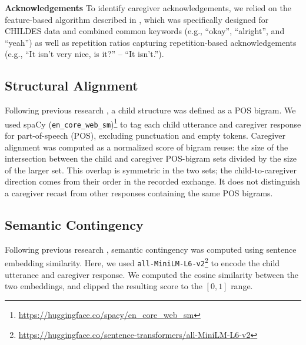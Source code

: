 \noindent \textbf{Acknowledgements} To identify caregiver acknowledgements, we relied on the feature-based algorithm described in \citet{nikolaus_communicative_2023a}, which was specifically designed for CHILDES data and combined common keywords (e.g., ``okay'', ``alright'', and ``yeah'') as well as repetition ratios capturing repetition-based acknowledgements (e.g., ``It isn’t very nice, is it?'' – ``It isn't.''). 

\subsection*{Structural Alignment}


Following previous research \cite{dale_unraveling_2006, fernandez_quantifying_2014}, a child structure was defined as a POS bigram. We used spaCy (\texttt{en\_core\_web\_sm})\footnote{\url{https://huggingface.co/spacy/en_core_web_sm}} to tag each child utterance and caregiver response for part-of-speech (POS), excluding punctuation and empty tokens. Caregiver alignment was computed as a normalized score of bigram reuse: the size of the intersection between the child and caregiver POS-bigram sets divided by the size of the larger set. This overlap is symmetric in the two sets; the child-to-caregiver direction comes from their order in the recorded exchange. It does not distinguish a caregiver recast from other responses containing the same POS bigrams.

\subsection*{Semantic Contingency}

Following previous research \cite[e.g.,][]{fusaroli_caregiver_2023, foushee2022getting}, semantic contingency was computed using sentence embedding similarity. Here, we used \texttt{all-MiniLM-L6-v2}\footnote{\url{https://huggingface.co/sentence-transformers/all-MiniLM-L6-v2}} to encode the child utterance and caregiver response. We computed the cosine similarity between the two embeddings, and clipped the resulting score to the $[0,1]$ range.

